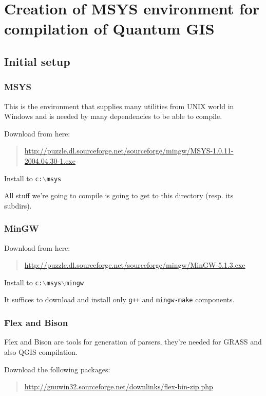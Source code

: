 \section{Creation of MSYS environment for compilation of Quantum GIS}
\subsection{Initial setup}
\subsubsection{MSYS}
This is the environment that supplies many utilities from UNIX world in Windows and is needed
by many dependencies to be able to compile.

Download from here:

	\begin{quotation}
\url{http://puzzle.dl.sourceforge.net/sourceforge/mingw/MSYS-1.0.11-2004.04.30-1.exe}
	\end{quotation}

Install to \texttt{c:$\backslash$msys}

All stuff we're going to compile is going to get to this directory (resp. its subdirs).

\subsubsection{MinGW}
Download from here:

	\begin{quotation}
\url{http://puzzle.dl.sourceforge.net/sourceforge/mingw/MinGW-5.1.3.exe}
	\end{quotation}

Install to \texttt{c:$\backslash$msys$\backslash$mingw}

It suffices to download and install only \texttt{g++} and \texttt{mingw-make} components.

\subsubsection{Flex and Bison}
Flex and Bison are tools for generation of parsers, they're needed for GRASS and also QGIS compilation.

Download the following packages:

	\begin{quotation}
\url{http://gnuwin32.sourceforge.net/downlinks/flex-bin-zip.php}
	\end{quotation}

